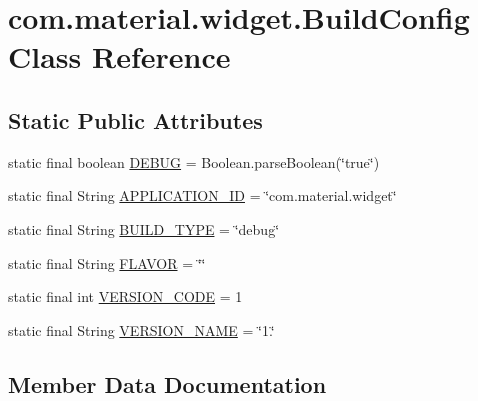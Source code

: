 \hypertarget{classcom_1_1material_1_1widget_1_1_build_config}{}\section{com.\+material.\+widget.\+Build\+Config Class Reference}
\label{classcom_1_1material_1_1widget_1_1_build_config}
\subsection*{Static Public Attributes}
\begin{DoxyCompactItemize}
\item 
static final boolean \hyperlink{classcom_1_1material_1_1widget_1_1_build_config_a79846bcadc35ca7d94861b16b220f9f8}{D\+E\+B\+UG} = Boolean.\+parse\+Boolean(\char`\"{}true\char`\"{})
\item 
static final String \hyperlink{classcom_1_1material_1_1widget_1_1_build_config_a320d0ee9c7766f768af01f57b317e4f4}{A\+P\+P\+L\+I\+C\+A\+T\+I\+O\+N\+\_\+\+ID} = \char`\"{}com.\+material.\+widget\char`\"{}
\item 
static final String \hyperlink{classcom_1_1material_1_1widget_1_1_build_config_a829dc10e096b19a30dea03d1ec693763}{B\+U\+I\+L\+D\+\_\+\+T\+Y\+PE} = \char`\"{}debug\char`\"{}
\item 
static final String \hyperlink{classcom_1_1material_1_1widget_1_1_build_config_ae7e60abfdc34b4f12fc243a143d59ba8}{F\+L\+A\+V\+OR} = \char`\"{}\char`\"{}
\item 
static final int \hyperlink{classcom_1_1material_1_1widget_1_1_build_config_af84afbd893084a73841d4268ae113a8d}{V\+E\+R\+S\+I\+O\+N\+\_\+\+C\+O\+DE} = 1
\item 
static final String \hyperlink{classcom_1_1material_1_1widget_1_1_build_config_a9dd9ebf639d4e80aceb582ac53811c0e}{V\+E\+R\+S\+I\+O\+N\+\_\+\+N\+A\+ME} = \char`\"{}1.\char`\"{}
\end{DoxyCompactItemize}


\subsection{Member Data Documentation}
\mbox{\label{classcom_1_1material_1_1widget_1_1_build_config_a320d0ee9c7766f768af01f57b317e4f4}} 
